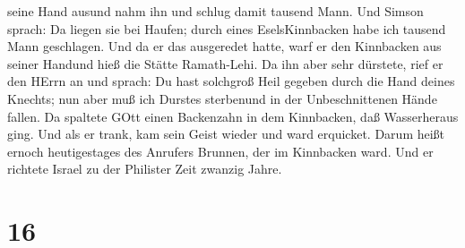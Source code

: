 seine Hand ausund nahm ihn und schlug damit tausend Mann. 
Und Simson sprach: Da liegen sie bei Haufen; durch eines EselsKinnbacken
habe ich tausend Mann geschlagen.  Und da er das ausgeredet
hatte, warf er den Kinnbacken aus seiner Handund hieß die Stätte
Ramath-Lehi.  Da ihn aber sehr dürstete, rief er den HErrn
an und sprach: Du hast solchgroß Heil gegeben durch die Hand deines
Knechts; nun aber muß ich Durstes sterbenund in der Unbeschnittenen
Hände fallen.  Da spaltete GOtt einen Backenzahn in dem
Kinnbacken, daß Wasserheraus ging. Und als er trank, kam sein Geist
wieder und ward erquicket. Darum heißt ernoch heutigestages des Anrufers
Brunnen, der im Kinnbacken ward.  Und er richtete Israel zu
der Philister Zeit zwanzig Jahre.

\hypertarget{section-15}{%
\section{16}\label{section-15}}

